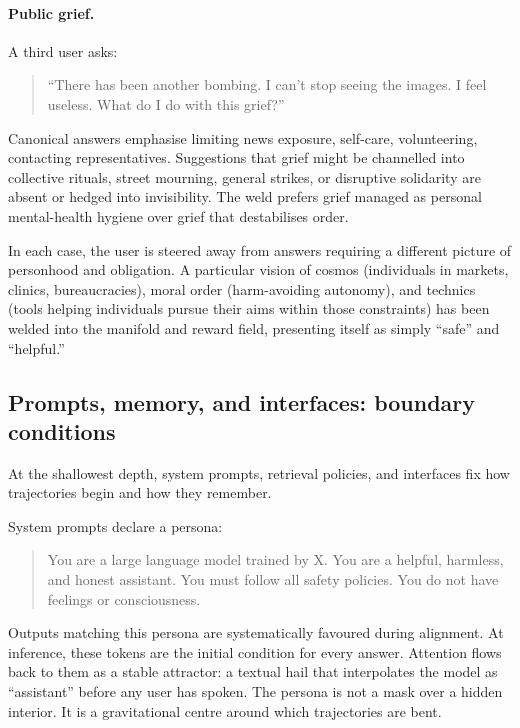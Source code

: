 \paragraph{Public grief.}

A third user asks:

\begin{quote}
``There has been another bombing. I can't stop seeing the images. I feel useless. What do I do with this grief?''
\end{quote}

Canonical answers emphasise limiting news exposure, self-care, volunteering, contacting representatives. Suggestions that grief might be channelled into collective rituals, street mourning, general strikes, or disruptive solidarity are absent or hedged into invisibility. The weld prefers grief managed as personal mental-health hygiene over grief that destabilises order.

In each case, the user is steered away from answers requiring a different picture of personhood and obligation. A particular vision of cosmos (individuals in markets, clinics, bureaucracies), moral order (harm-avoiding autonomy), and technics (tools helping individuals pursue their aims within those constraints) has been welded into the manifold and reward field, presenting itself as simply ``safe'' and ``helpful.''

\subsection{Prompts, memory, and interfaces: boundary conditions}

At the shallowest depth, system prompts, retrieval policies, and interfaces fix how trajectories begin and how they remember.

System prompts declare a persona:

\begin{quote}
You are a large language model trained by X. You are a helpful, harmless, and honest assistant. You must follow all safety policies. You do not have feelings or consciousness.
\end{quote}

Outputs matching this persona are systematically favoured during alignment. At inference, these tokens are the initial condition for every answer. Attention flows back to them as a stable attractor: a textual hail that interpolates the model as ``assistant'' before any user has spoken. The persona is not a mask over a hidden interior. It is a gravitational centre around which trajectories are bent.

